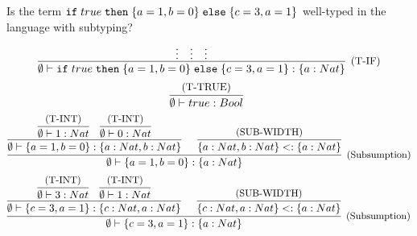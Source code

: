 \subsection{}

Is the term $\texttt{if}\;true\;\texttt{then}\;\{a=1,b=0\}\;\texttt{else}\;\{c=3,a=1\}$ well-typed in the language with subtyping?
\[
  \infer[\text{\small{(T-IF)}}]
  { \emptyset \vdash \IF{true}{\REC{a=1,b=0}}{\REC{c=3,a=1}}: \TREC{a: Nat} }
  {
    \vdots &
    \vdots &
    \vdots
  }
\]
\[
  \infer[]
  { \emptyset \vdash true: Bool}
  {\text{\small{(T-TRUE)}}}
\]
\[
  \infer[\text{\small{(Subsumption)}}]
  { \emptyset \vdash \REC{a=1,b=0}: \TREC{a: Nat} }
  {
    \infer[]
    {\emptyset \vdash \REC{a=1,b=0}: \TREC{a: Nat, b: Nat}}
    {
      \infer{ \emptyset \vdash 1: Nat}{\text{\small{(T-INT)}}} &
      \infer{ \emptyset \vdash 0: Nat}{\text{\small{(T-INT)}}}
    } &
    \infer[]
    {\TREC{a: Nat, b: Nat} <: \TREC{a: Nat}}
    {\text{\small{(SUB-WIDTH)}}}
  }
\]
\[
  \infer[\text{\small{(Subsumption)}}]
  { \emptyset \vdash \REC{c=3,a=1}: \TREC{a: Nat} }
  {
    \infer[]
    { \emptyset \vdash \REC{c=3,a=1}: \TREC{c: Nat, a: Nat} }
    {
      \infer{ \emptyset \vdash 3: Nat}{\text{\small{(T-INT)}}} &
      \infer{ \emptyset \vdash 1: Nat}{\text{\small{(T-INT)}}}
    } &
    \infer[]
    {\TREC{c: Nat, a: Nat} <: \TREC{a: Nat}}
    {\text{\small{(SUB-WIDTH)}}}
  }
\]
